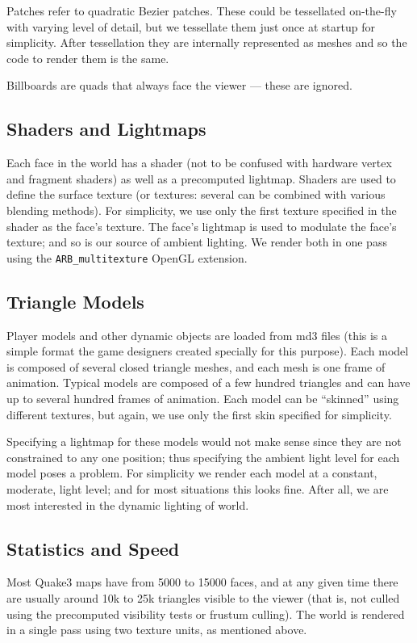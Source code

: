 \documentclass{llncs}
\begin{document}
\begin{multicols}{2}
{Patches refer to quadratic Bezier patches.  These could be tessellated on-the-fly with
varying level of detail, but we tessellate them just once at startup for simplicity.
After tessellation they are internally represented as meshes and so the code
to render them is the same.  

Billboards are quads that always face the viewer --- these are ignored.

\subsection{Shaders and Lightmaps} Each face in the world has a shader
(not to be confused with hardware vertex and fragment shaders)
as well as a precomputed lightmap.  Shaders are used to define the surface texture 
(or textures: several can be combined with various blending methods).  For simplicity, 
we use only the first texture specified in the shader as the face's texture.
The face's lightmap is used to modulate the face's texture; and so is our source
of ambient lighting. We render both in one pass using the {\tt ARB\_multitexture} 
OpenGL extension.

\subsection{Triangle Models} Player models and other dynamic objects are loaded
from md3 files (this is a simple format the game designers created specially for this
purpose).  Each model is composed of several closed triangle meshes, and each mesh 
is one frame of animation.  Typical models are composed of a few hundred triangles 
and can have up to several hundred frames of animation. 
Each model can be ``skinned'' using different textures, but again, we use 
only the first skin specified for simplicity.   

Specifying a lightmap for these models would not make sense since they are not
constrained to any one position; thus specifying the ambient light level for each
model poses a problem.  For simplicity we render 
each model at a constant, moderate, light level; and for most situations this looks fine.
After all, we are most interested in the dynamic lighting of world. 

\subsection{Statistics and Speed} Most Quake3 maps have from 5000 to 15000 faces,
and at any given time there are usually around 10k to 25k triangles visible to the
viewer (that is, not culled using the precomputed visibility tests or frustum culling).
The world is rendered in a single pass using two texture units, as mentioned above.  

}
\end{multicols}
\end{document}
